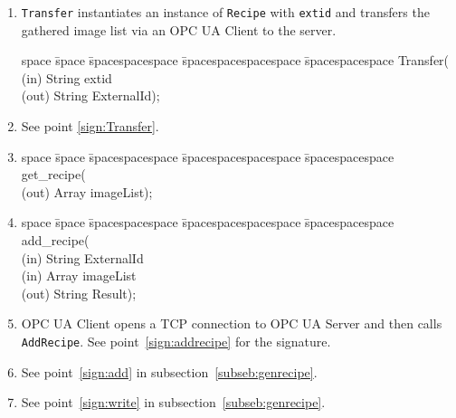 \begin{enumerate}
    \item \texttt{Transfer} instantiates an instance of \texttt{Recipe} with \texttt{extid} and transfers the gathered image list via an OPC UA Client to the server.
    \begin{tabbing}
    space \= space \= spacespacespace \= spacespacespacespace \= spacespacespace \kill
    \>  Transfer(\\
    \>  \>  (in)	 \> 	String          \> extid\\
    \>  \>  (out)	 \> 	String          \> ExternalId);
    \end{tabbing} \label{sign:Transfer}
    \item See point \ref{sign:Transfer}.
    \item 
    \begin{tabbing}
    space \= space \= spacespacespace \= spacespacespacespace \= spacespacespace \kill
    \>  get\_recipe(\\
    \>  \>  (out)	 \> 	Array          \> imageList); 
    \end{tabbing}
    \item 
    \begin{tabbing}
    space \= space \= spacespacespace \= spacespacespacespace \= spacespacespace \kill
    \>  add\_recipe(\\
    \>  \>  (in)	 \> 	String          \> ExternalId\\
    \>  \>  (in)	 \> 	Array          \> imageList\\
    \>  \>  (out)	 \> 	String          \> Result); 
    \end{tabbing}\label{sign:addrecipe}
    \item OPC UA Client opens a TCP connection to OPC UA Server and then calls \texttt{AddRecipe}. See point~\ref{sign:addrecipe} for the signature.
    \item See point~\ref{sign:add} in subsection~\ref{subseb:genrecipe}.
    \item See point~\ref{sign:write} in subsection~\ref{subseb:genrecipe}.
\end{enumerate}

